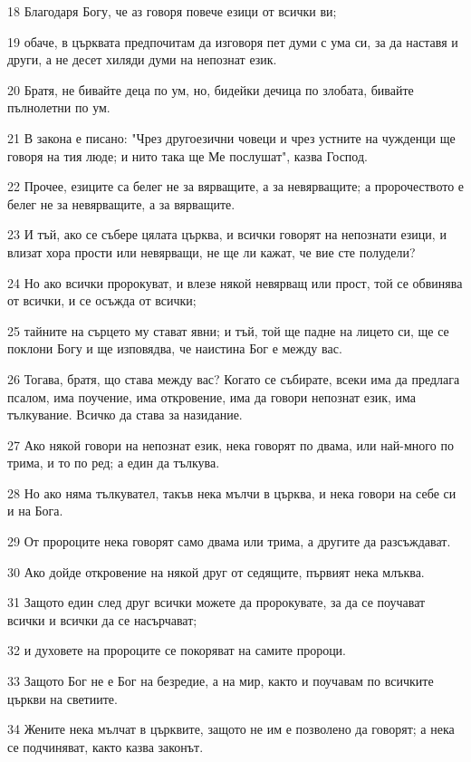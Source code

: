 \par 18 Благодаря Богу, че аз говоря повече езици от всички ви;
\par 19 обаче, в църквата предпочитам да изговоря пет думи с ума си, за да наставя и други, а не десет хиляди думи на непознат език.
\par 20 Братя, не бивайте деца по ум, но, бидейки дечица по злобата, бивайте пълнолетни по ум.
\par 21 В закона е писано: "Чрез другоезични човеци и чрез устните на чужденци ще говоря на тия люде; и нито така ще Ме послушат", казва Господ.
\par 22 Прочее, езиците са белег не за вярващите, а за невярващите; а пророчеството е белег не за невярващите, а за вярващите.
\par 23 И тъй, ако се събере цялата църква, и всички говорят на непознати езици, и влизат хора прости или невярващи, не ще ли кажат, че вие сте полудели?
\par 24 Но ако всички пророкуват, и влезе някой невярващ или прост, той се обвинява от всички, и се осъжда от всички;
\par 25 тайните на сърцето му стават явни; и тъй, той ще падне на лицето си, ще се поклони Богу и ще изповядва, че наистина Бог е между вас.
\par 26 Тогава, братя, що става между вас? Когато се събирате, всеки има да предлага псалом, има поучение, има откровение, има да говори непознат език, има тълкувание. Всичко да става за назидание.
\par 27 Ако някой говори на непознат език, нека говорят по двама, или най-много по трима, и то по ред; а един да тълкува.
\par 28 Но ако няма тълкувател, такъв нека мълчи в църква, и нека говори на себе си и на Бога.
\par 29 От пророците нека говорят само двама или трима, а другите да разсъждават.
\par 30 Ако дойде откровение на някой друг от седящите, първият нека млъква.
\par 31 Защото един след друг всички можете да пророкувате, за да се поучават всички и всички да се насърчават;
\par 32 и духовете на пророците се покоряват на самите пророци.
\par 33 Защото Бог не е Бог на безредие, а на мир, както и поучавам по всичките църкви на светиите.
\par 34 Жените нека мълчат в църквите, защото не им е позволено да говорят; а нека се подчиняват, както казва законът.
